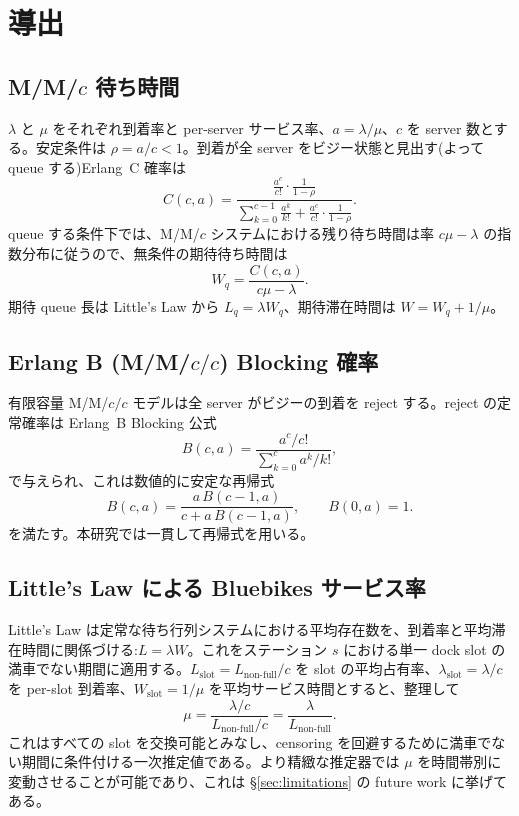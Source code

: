 \section{導出}\label{app:derivations}

\subsection{M/M/$c$ 待ち時間}\label{app:mmc}

$\lambda$ と $\mu$ をそれぞれ到着率と per-server サービス率、$a = \lambda/\mu$、$c$ を server 数とする。安定条件は $\rho = a/c < 1$。到着が全 server をビジー状態と見出す(よって queue する)Erlang~C 確率は
\begin{equation}
C(c, a) = \frac{\frac{a^c}{c!}\cdot\frac{1}{1-\rho}}{\sum_{k=0}^{c-1} \frac{a^k}{k!} + \frac{a^c}{c!}\cdot\frac{1}{1-\rho}}.
\end{equation}
queue する条件下では、M/M/$c$ システムにおける残り待ち時間は率 $c\mu - \lambda$ の指数分布に従うので、無条件の期待待ち時間は
\begin{equation}
W_q = \frac{C(c, a)}{c\mu - \lambda}.
\end{equation}
期待 queue 長は Little's Law から $L_q = \lambda W_q$、期待滞在時間は $W = W_q + 1/\mu$。

\subsection{Erlang B (M/M/$c/c$) Blocking 確率}\label{app:erlangb}

有限容量 M/M/$c/c$ モデルは全 server がビジーの到着を reject する。reject の定常確率は Erlang~B Blocking 公式
\begin{equation}
B(c, a) = \frac{a^c / c!}{\sum_{k=0}^{c} a^k / k!},
\end{equation}
で与えられ、これは数値的に安定な再帰式
\begin{equation}
B(c, a) = \frac{a\,B(c-1, a)}{c + a\,B(c-1, a)}, \qquad B(0, a) = 1.
\end{equation}
を満たす。本研究では一貫して再帰式を用いる。

\subsection{Little's Law による Bluebikes サービス率}\label{app:little}

Little's Law \cite{little1961} は定常な待ち行列システムにおける平均存在数を、到着率と平均滞在時間に関係づける:$L = \lambda W$。これをステーション $s$ における単一 dock slot の満車でない期間に適用する。$L_{\text{slot}} = L_{\text{non-full}} / c$ を slot の平均占有率、$\lambda_{\text{slot}} = \lambda / c$ を per-slot 到着率、$W_{\text{slot}} = 1/\mu$ を平均サービス時間とすると、整理して
\begin{equation}
\mu = \frac{\lambda / c}{L_{\text{non-full}} / c} = \frac{\lambda}{L_{\text{non-full}}}.
\end{equation}
これはすべての slot を交換可能とみなし、censoring を回避するために満車でない期間に条件付ける一次推定値である。より精緻な推定器では $\mu$ を時間帯別に変動させることが可能であり、これは \S\ref{sec:limitations} の future work に挙げてある。
